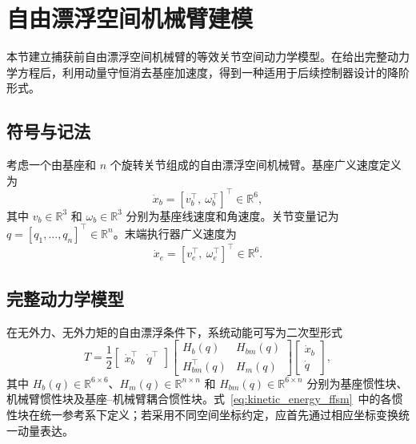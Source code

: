 \section{自由漂浮空间机械臂建模}
\label{sec:modeling}

本节建立捕获前自由漂浮空间机械臂的等效关节空间动力学模型。在给出完整动力学方程后，利用动量守恒消去基座加速度，得到一种适用于后续控制器设计的降阶形式。

\subsection{符号与记法}

考虑一个由基座和 \(n\) 个旋转关节组成的自由漂浮空间机械臂。基座广义速度定义为
\[
\dot x_b=[v_b^\top,\ \omega_b^\top]^\top\in\mathbb R^6,
\]
其中 \(v_b\in\mathbb R^3\) 和 \(\omega_b\in\mathbb R^3\) 分别为基座线速度和角速度。关节变量记为 \(q=[q_1,\ldots,q_n]^\top\in\mathbb R^n\)。末端执行器广义速度为
\[
\dot x_e=[v_e^\top,\ \omega_e^\top]^\top\in\mathbb R^6.
\]

\subsection{完整动力学模型}

在无外力、无外力矩的自由漂浮条件下，系统动能可写为二次型形式
\begin{equation}
T=\frac12
\begin{bmatrix}\dot x_b^\top & \dot q^\top\end{bmatrix}
\begin{bmatrix}
H_b(q) & H_{bm}(q)\\
H_{bm}^\top(q) & H_m(q)
\end{bmatrix}
\begin{bmatrix}\dot x_b\\ \dot q\end{bmatrix},
\label{eq:kinetic_energy_ffsm}
\end{equation}
其中 \(H_b(q)\in\mathbb R^{6\times6}\)、\(H_m(q)\in\mathbb R^{n\times n}\) 和 \(H_{bm}(q)\in\mathbb R^{6\times n}\) 分别为基座惯性块、机械臂惯性块及基座--机械臂耦合惯性块。式~\eqref{eq:kinetic_energy_ffsm}~中的各惯性块在统一参考系下定义；若采用不同空间坐标约定，应首先通过相应坐标变换统一动量表达。

